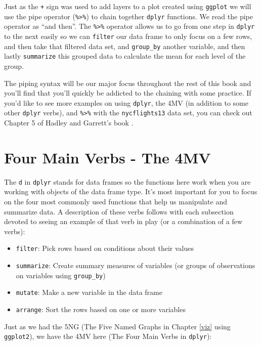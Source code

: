 \documentclass[]{tufte-book}
\providecommand{\tightlist}{%
  \setlength{\itemsep}{0pt}\setlength{\parskip}{0pt}}
\begin{document}
Just as the \texttt{+} sign was used to add layers to a plot created
using \texttt{ggplot} we will use the pipe operator
(\texttt{\%\textgreater{}\%}) to chain together \texttt{dplyr}
functions. We read the pipe operator as ``and then''. The
\texttt{\%\textgreater{}\%} operator allows us to go from one step in
\texttt{dplyr} to the next easily so we can \texttt{filter} our data
frame to only focus on a few rows, and then take that filtered data set,
and \texttt{group\_by} another variable, and then lastly
\texttt{summarize} this grouped data to calculate the mean for each
level of the group.

The piping syntax will be our major focus throughout the rest of this
book and you'll find that you'll quickly be addicted to the chaining
with some practice. If you'd like to see more examples on using
\texttt{dplyr}, the 4MV (in addition to some other \texttt{dplyr}
verbs), and \texttt{\%\textgreater{}\%} with the \texttt{nycflights13}
data set, you can check out Chapter 5 of Hadley and Garrett's book
\citep{rds2016}.

\section{Four Main Verbs - The 4MV}\label{four-main-verbs---the-4mv}

The \texttt{d} in \texttt{dplyr} stands for data frames so the functions
here work when you are working with objects of the data frame type. It's
most important for you to focus on the four most commonly used functions
that help us manipulate and summarize data. A description of these verbs
follows with each subsection devoted to seeing an example of that verb
in play (or a combination of a few verbs):

\begin{itemize}
\tightlist
\item
  \texttt{filter}: Pick rows based on conditions about their values
\item
  \texttt{summarize}: Create summary measures of variables (or groups of
  observations on variables using \texttt{group\_by})
\item
  \texttt{mutate}: Make a new variable in the data frame
\item
  \texttt{arrange}: Sort the rows based on one or more variables
\end{itemize}

Just as we had the 5NG (The Five Named Graphs in Chapter \ref{viz} using
\texttt{ggplot2}), we have the 4MV here (The Four Main Verbs in
\texttt{dplyr}):
\end{document}
